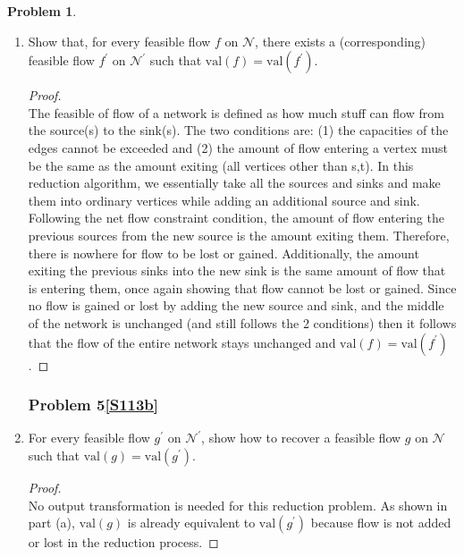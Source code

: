 \documentclass[11pt]{article}
\theoremstyle{definition}
\theoremstyle{definition}
\newtheorem{required}{Problem}
\theoremstyle{definition}
\begin{document}
\begin{required}
\begin{enumerate}[label=(\alph*)]
\subsubsection{Problem 5\ref{S113a}}
\item \label{S113a} Show that, for every feasible flow $f$ on $\mathcal{N}$, there exists a (corresponding) feasible flow $f^{\prime}$ on $\mathcal{N}^{\prime}$ such that $\text{val}(f) = \text{val}(f^{\prime})$. 

\begin{proof} $ $ \\
The feasible of flow of a network is defined as how much stuff can flow from the source(s) to the sink(s). The two conditions are: (1) the capacities of the edges cannot be exceeded and (2) the amount of flow entering a vertex must be the same as the amount exiting (all vertices other than s,t). In this reduction algorithm, we essentially take all the sources and sinks and make them into ordinary vertices while adding an additional source and sink. Following the net flow constraint condition, the amount of flow entering the previous sources from the new source is the amount exiting them. Therefore, there is nowhere for flow to be lost or gained. Additionally, the amount exiting the previous sinks into the new sink is the same amount of flow that is entering them, once again showing that flow cannot be lost or gained. Since no flow is gained or lost by adding the new source and sink, and the middle of the network is unchanged (and still follows the 2 conditions) then it follows that the flow of the entire network stays unchanged and $\text{val}(f) = \text{val}(f^{\prime})$.


\end{proof}



\newpage
\subsubsection{Problem 5\ref{S113b}}
\item \label{S113b} For every feasible flow $g^\prime$ on $\mathcal{N}^{\prime}$, show how to recover a feasible flow $g$ on $\mathcal{N}$ such that $\text{val}(g) = \text{val}(g^{\prime})$. 

\begin{proof} $ $ \\ 
No output transformation is needed for this reduction problem. As shown in part (a), $\text{val}(g)$ is already equivalent to $\text{val}(g^{\prime})$ because flow is not added or lost in the reduction process.
\end{proof}
\end{enumerate}
\end{required}
\end{document}
